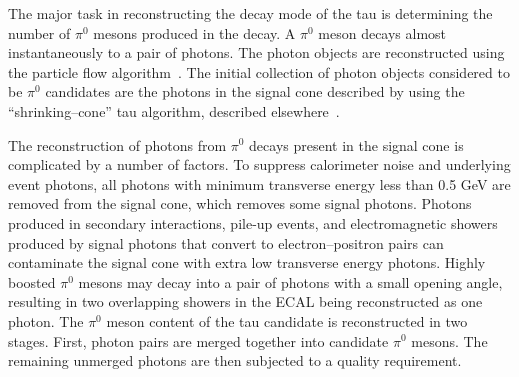 The major task in reconstructing the decay mode of the tau is determining the
number of $\pi^0$ mesons produced in the decay.  A $\pi^0$ meson decays almost
instantaneously to a pair of photons.  The photon objects are reconstructed using the
particle flow algorithm~\cite{CMS-PAS-PFT-09-001}. The initial collection of
photon objects considered to be $\pi^0$ candidates are the photons in the signal
cone described by using the ``shrinking--cone'' tau algorithm, described
elsewhere~\cite{CMS-PAS-PFT-08-001}.  

The reconstruction of photons from $\pi^0$ decays present in the signal cone is
complicated by a number of factors.  To suppress calorimeter noise and underlying
event photons, all photons with minimum transverse energy less than 0.5 GeV are
removed from the signal cone, which removes some signal photons.  Photons
produced in secondary interactions, pile-up events, and electromagnetic showers
produced by signal photons that convert to electron--positron pairs can
contaminate the signal cone with extra low transverse energy photons.  Highly
boosted $\pi^0$ mesons may decay into a pair of photons with a small opening
angle, resulting in two overlapping showers in the ECAL being reconstructed as
one photon.  The $\pi^0$ meson content of the tau candidate is reconstructed in
two stages.  First, photon pairs are merged together into candidate $\pi^0$
mesons.  The remaining unmerged photons are then subjected to a quality
requirement.
